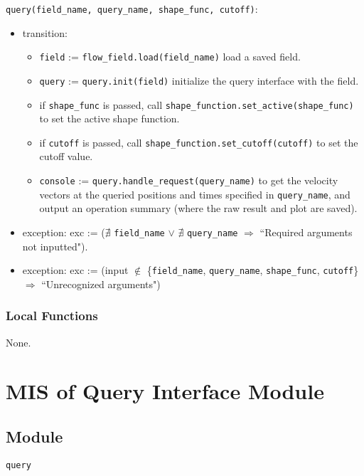 \documentclass[12pt, titlepage]{article}
\begin{document}
\noindent \texttt{query(field\_name, query\_name, shape\_func, cutoff)}:
\begin{itemize}
  \item transition:
  \begin{itemize}
    \item \texttt{field} := \texttt{flow\_field.load(field\_name)} load a saved field.
    \item \texttt{query} := \texttt{query.init(field)} initialize the query interface with the field.
    \item if \texttt{shape\_func} is passed, call \texttt{shape\_function.set\_active(shape\_func)} to set the active shape function.
    \item if \texttt{cutoff} is passed, call \texttt{shape\_function.set\_cutoff(cutoff)} to set the cutoff value.
    \item \texttt{console} := \texttt{query.handle\_request(query\_name)} to get the velocity vectors at the queried positions and times specified in \texttt{query\_name}, and output an operation summary (where the raw result and plot are saved).
  \end{itemize}
  \item exception: exc := ($\nexists$ \texttt{field\_name} $\vee$ $\nexists$ \texttt{query\_name} $\Rightarrow$ ``Required arguments not inputted"). 
  \item exception: exc := (input $\notin$ \{\texttt{field\_name}, \texttt{query\_name}, \texttt{shape\_func}, \texttt{cutoff}\} $\Rightarrow$ ``Unrecognized arguments")
\end{itemize}

\subsubsection{Local Functions}

None.


\newpage
\section{MIS of Query Interface Module} \label{mQuery} 



\subsection{Module}
\texttt{query}
\end{document}
